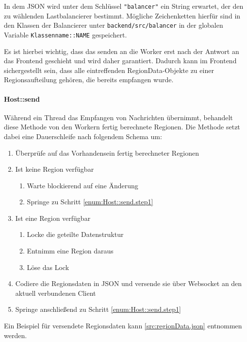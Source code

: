 In dem JSON wird unter dem Schlüssel \texttt{"balancer"} ein String erwartet, der den zu wählenden Lastbalancierer bestimmt.
Mögliche Zeichenketten hierfür sind in den Klassen der Balancierer unter \verb|backend/src/balancer| in der globalen Variable
\verb|Klassenname::NAME| gespeichert.

Es ist hierbei wichtig, dass das senden an die Worker erst nach der Antwort an das Frontend geschieht und wird daher garantiert.
Dadurch kann im Frontend sichergestellt sein, dass alle eintreffenden RegionData-Objekte zu einer Regionsaufteilung gehören,
die bereits empfangen wurde.

\paragraph{Host::send}\label{cls:Host::send}

Während ein Thread das Empfangen von Nachrichten übernimmt, behandelt diese Methode von den Workern fertig berechnete Regionen.
Die Methode setzt dabei eine Dauerschleife nach folgendem Schema um:

\begin{enumerate}
    \item Überprüfe auf das Vorhandensein fertig berechneter Regionen \label{enum:Host::send.step1}
    \item Ist keine Region verfügbar
    \begin{enumerate}
        \item Warte blockierend auf eine Änderung
        \item Springe zu Schritt \ref{enum:Host::send.step1}
    \end{enumerate}
    \item Ist eine Region verfügbar
    \begin{enumerate}
        \item Locke die geteilte Datenstruktur
        \item Entnimm eine Region daraus
        \item Löse das Lock
    \end{enumerate}
    \item Codiere die Regionsdaten in JSON und versende sie über Websocket an den aktuell verbundenen Client
    \item Springe anschließend zu Schritt \ref{enum:Host::send.step1}
\end{enumerate}

Ein Beispiel für versendete Regionsdaten kann \autoref{src:regionData.json} entnommen werden.

